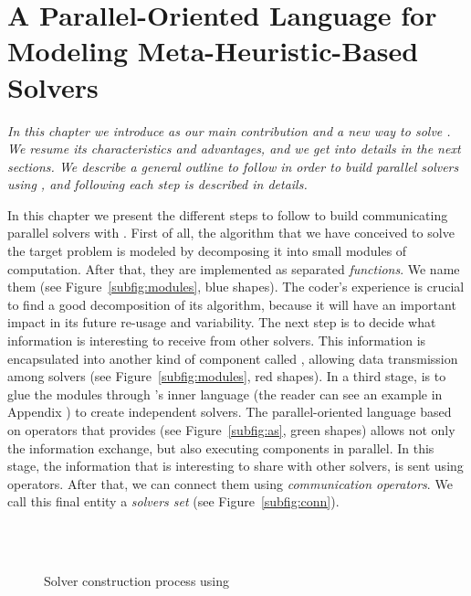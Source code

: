 \chapter{A Parallel-Oriented Language for Modeling Meta-Heuristic-Based Solvers}
\label{chap:posl}
\textit{In this chapter we introduce \posl{} as our main contribution and a new way to solve \csps{}. We resume its characteristics and advantages, and we get into details in the next sections. We describe a general outline to follow in order to build parallel solvers using \posl, and following each step is described in details.}
\vfill
\minitoc
\newpage

In this chapter we present the different steps to follow to build communicating parallel solvers with \posl. 
First of all, the algorithm that we have conceived to solve the target problem is modeled by decomposing it into small modules of computation. After that, they are implemented as separated {\it functions}. We name them \oms{} (see Figure~\ref{subfig:modules}, blue shapes). The coder's experience is crucial to find a good decomposition of its algorithm, because it will have an important impact in its future re-usage  and variability. The next step is to decide what information is interesting to receive from other solvers. This information is encapsulated into another kind of component called \opch, allowing data transmission among solvers (see Figure~\ref{subfig:modules}, red shapes).
In a third stage, is to glue the modules through \posl{}'s inner language (the reader can see an example in Appendix \tet{[...]}) to create independent solvers.
The parallel-oriented language based on operators that \posl{} provides (see Figure~\ref{subfig:as}, green shapes) allows not only the information exchange, but also executing components in parallel. In this stage, the information that is interesting to share with other solvers, is sent using operators. After that, we can connect them using {\it communication operators}. We call this final entity a {\it solvers set} (see Figure~\ref{subfig:conn}).

\begin{figure}[h]
	\centering
	\\
	\\
	\caption[]{Solver construction process using \posl}
	\label{fig:posl}
\end{figure}

